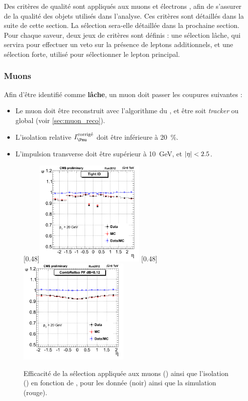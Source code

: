 \bigskip

Des critères de qualité sont appliqués aux muons et électrons \pf, afin de s'assurer de la qualité des objets utilisés dans l'analyse. Ces critères sont détaillés dans la suite de cette section. La sélection sera-elle détaillée dans la prochaine section. Pour chaque saveur, deux jeux de critères sont définis : une sélection lâche, qui servira pour effectuer un veto sur la présence de leptons additionnels, et une sélection forte, utilisé pour sélectionner le lepton principal.

\subsubsection{Muons} \label{sec:sel_muon}

Afin d'être identifié comme \textbf{lâche}, un muon doit passer les coupures suivantes :
\begin{itemize}
    \item Le muon doit être reconstruit avec l'algorithme du \pf, et être soit \emph{tracker} ou global (voir \cref{sec:muon_reco}).
    \item L'isolation relative $I_{\Pmu}^\text{corrigé}$ doit être inférieure à \SI{20}{\%}.
    \item L'impulsion transverse doit être supérieur à \SI{10}{\GeV}, et $\lvert \eta \rvert < \num{2.5}$.
\end{itemize}

\begin{figure}[tbp] \centering
    \subcaptionbox{\label{fig:muon_id_eff}}[0.48\textwidth]{\includegraphics[width=0.48\textwidth]{chapitre7/figs/muon_id_efficiency.png}} \hfill
    \subcaptionbox{\label{fig:muon_iso_eff}}[0.48\textwidth]{\includegraphics[width=0.48\textwidth]{chapitre7/figs/muon_iso_efficiency.png}}
    \caption{Efficacité de la sélection appliquée aux muons () ainsi que l'isolation () en fonction de \aeta, pour les donnée (noir) ainsi que la simulation (rouge).}
\end{figure}

